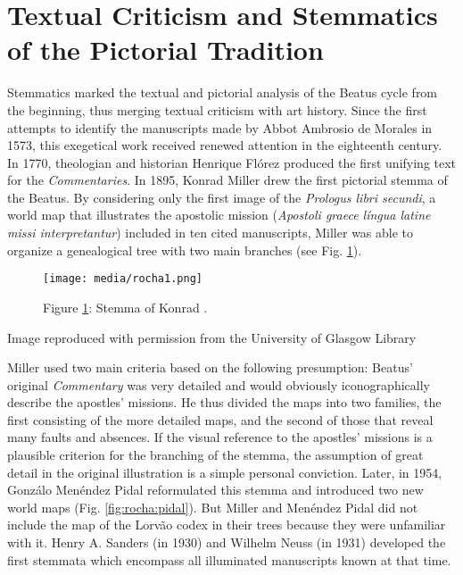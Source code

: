 \documentclass{article}
\begin{document}
\section*{Textual Criticism and Stemmatics of the Pictorial Tradition}

Stemmatics marked the textual and pictorial analysis of the Beatus cycle
from the beginning, thus merging textual criticism with art history.
Since the first attempts to identify the manuscripts made by Abbot
Ambrosio de Morales in 1573, this exegetical work received renewed
attention in the eighteenth century. In 1770, theologian and historian
Henrique Flórez produced the first unifying text for the
\emph{Commentaries}. In 1895, Konrad Miller drew the first pictorial stemma of the Beatus. By considering only the first image of the
\emph{Prologus libri secundi}, a world map that illustrates the
apostolic mission (\emph{Apostoli graece língua latine missi
interpretantur}) included in ten cited manuscripts, Miller was able to
organize a genealogical tree with two main branches (see Fig.  \ref{fig:rocha:miller1895}).

\begin{figure}[H]
\centering
\texttt{[image: media/rocha1.png]}
\caption{Figure \ref{fig:rocha:miller1895}: Stemma of Konrad \citet{miller_mappaemundi_1895}.}
\label{fig:rocha:miller1895}
\end{figure}


 Image reproduced with permission from the University of Glasgow Library 


 
Miller used two main criteria based on the following presumption:
Beatus' original \emph{Commentary} was very detailed and would obviously
iconographically describe the apostles' missions. He thus divided the
maps into two families, the first consisting of the more detailed maps,
and the second of those that reveal many faults and absences. If the
visual reference to the apostles' missions is a plausible criterion for
the branching of the stemma, the assumption of great detail in
the original illustration is a simple personal conviction. Later, in
1954, Gonzálo Menéndez Pidal reformulated this stemma and
introduced two new world maps (Fig. \ref{fig:rocha:pidal}). But Miller and Menéndez Pidal
did not include the map of the Lorvão codex in their trees because they
were unfamiliar with it. Henry A. Sanders (in 1930) and Wilhelm Neuss
(in 1931) developed the first stemmata which encompass all
illuminated manuscripts known at that time.
\end{document}
